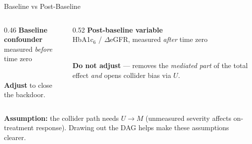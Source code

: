 \documentclass[aspectratio=169]{beamer}
\begin{document}
\begin{frame}{Baseline vs Post-Baseline}
  \small
  \begin{columns}[T]
    \begin{column}{0.46\textwidth}
      \centering
      \textbf{Baseline confounder}\\ {\scriptsize measured \emph{before} time zero}\\[0.9em]
      \\[0.9em]
      \textcolor{good}{\textbf{Adjust}} to close the backdoor.
    \end{column}
    \begin{column}{0.52\textwidth}
      \centering
      \textbf{Post-baseline variable}\\ {\scriptsize HbA1c$_6$ / $\Delta$eGFR, measured \emph{after} time zero}\\[0.9em]
      \\[0.9em]
      \textcolor{brick}{\textbf{Do not adjust}} --- removes the \emph{mediated part} of the total effect \emph{and} opens collider bias via $U$.
    \end{column}
  \end{columns}
  \vspace{0.6em}

  {\footnotesize\textcolor{accent}{\textbf{Assumption:}} the collider
  path needs $U\!\to\!M$ (unmeasured severity affects on-treatment response). Drawing out
  the DAG helps make these assumptions clearer.}
\end{frame}
\end{document}
